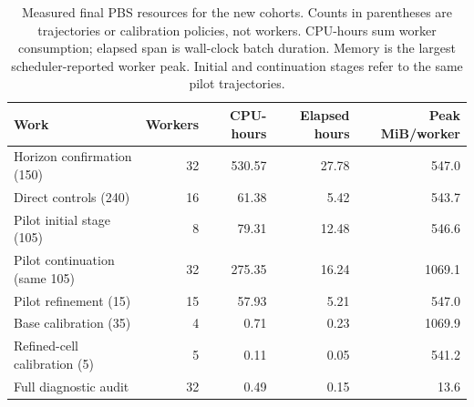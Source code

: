 \begin{table}[t]
\centering\small
\caption{Measured final PBS resources for the new cohorts. Counts in parentheses are trajectories or calibration policies, not workers. CPU-hours sum worker consumption; elapsed span is wall-clock batch duration. Memory is the largest scheduler-reported worker peak. Initial and continuation stages refer to the same pilot trajectories.}
\label{tab:measured_new_compute}
\begin{tabular}{@{}lrrrr@{}}\toprule
Work & Workers & CPU-hours & Elapsed hours & Peak MiB/worker \\
\midrule
Horizon confirmation (150) & 32 & 530.57 & 27.78 & 547.0 \\
Direct controls (240) & 16 & 61.38 & 5.42 & 543.7 \\
Pilot initial stage (105) & 8 & 79.31 & 12.48 & 546.6 \\
Pilot continuation (same 105) & 32 & 275.35 & 16.24 & 1069.1 \\
Pilot refinement (15) & 15 & 57.93 & 5.21 & 547.0 \\
Base calibration (35) & 4 & 0.71 & 0.23 & 1069.9 \\
Refined-cell calibration (5) & 5 & 0.11 & 0.05 & 541.2 \\
Full diagnostic audit & 32 & 0.49 & 0.15 & 13.6 \\
\bottomrule\end{tabular}
\end{table}
